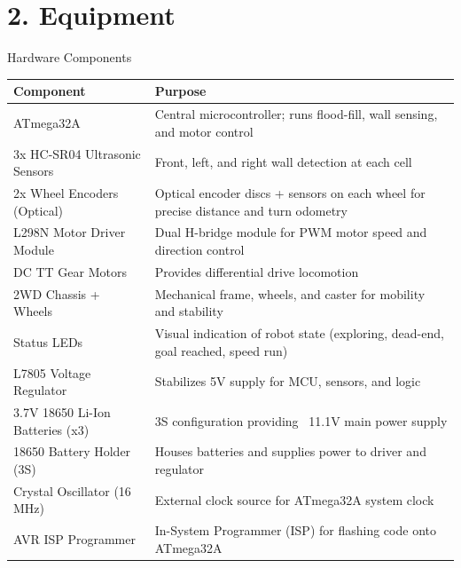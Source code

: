 \documentclass[aspectratio=169,11pt]{beamer}
\begin{document}
\section{2. Equipment}
\begin{frame}{Hardware Components}
    \begin{table}
        \centering
        \tiny
        \begin{tabular}{@{}lp{7.4cm}@{}}
            \toprule
            \textbf{Component} & \textbf{Purpose} \\
            \midrule
            ATmega32A & Central microcontroller; runs flood-fill, wall sensing, and motor control \\
            3x HC-SR04 Ultrasonic Sensors & Front, left, and right wall detection at each cell \\
            2x Wheel Encoders (Optical) & Optical encoder discs + sensors on each wheel for precise distance and turn odometry \\
            L298N Motor Driver Module & Dual H-bridge module for PWM motor speed and direction control \\
            DC TT Gear Motors & Provides differential drive locomotion \\
            2WD Chassis + Wheels & Mechanical frame, wheels, and caster for mobility and stability \\
            Status LEDs & Visual indication of robot state (exploring, dead-end, goal reached, speed run) \\
            L7805 Voltage Regulator & Stabilizes 5V supply for MCU, sensors, and logic \\
            3.7V 18650 Li-Ion Batteries (x3) & 3S configuration providing ~11.1V main power supply \\
            18650 Battery Holder (3S) & Houses batteries and supplies power to driver and regulator \\
            Crystal Oscillator (16 MHz) & External clock source for ATmega32A system clock \\
            AVR ISP Programmer & In-System Programmer (ISP) for flashing code onto ATmega32A \\
            \bottomrule
        \end{tabular}
    \end{table}
\end{frame}
\end{document}
